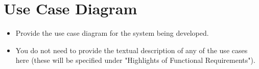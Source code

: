 \documentclass[]{article}
\begin{document}
\section{Use Case Diagram}
\label{sec:use_case_diagram}
\begin{itemize}
	\item Provide the use case diagram for the system being developed.
	\item You do not need to provide the textual description of any of the use cases here (these will be specified under "Highlights of Functional Requirements").
\end{itemize}

%
%
%
\end{document}
